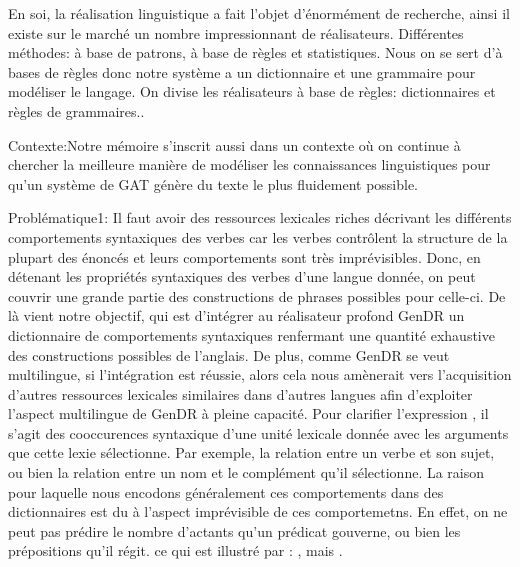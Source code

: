 En soi, la réalisation linguistique a fait l'objet d'énormément de recherche, ainsi il existe sur le marché un nombre impressionnant de réalisateurs. Différentes méthodes: à base de patrons, à base de règles et statistiques. Nous on se sert d'à bases de règles donc notre système a un dictionnaire et une grammaire pour modéliser le langage. On divise les réalisateurs à base de règles: dictionnaires et règles de grammaires.. 

Contexte:Notre mémoire s'inscrit aussi dans un contexte où on continue à chercher la meilleure manière de modéliser les connaissances linguistiques pour qu'un système de \ac{GAT} génère du texte le plus fluidement possible.

Problématique1: Il faut avoir des ressources lexicales riches décrivant les différents comportements syntaxiques des verbes car les verbes contrôlent la structure de la plupart des énoncés et leurs comportements sont très imprévisibles. Donc, en détenant les propriétés syntaxiques des verbes d'une langue donnée, on peut couvrir une grande partie des constructions de phrases possibles pour celle-ci. De là vient notre objectif, qui est d'intégrer au réalisateur profond GenDR un dictionnaire de comportements syntaxiques renfermant une quantité exhaustive des constructions possibles de l'anglais. De plus, comme GenDR se veut multilingue, si l'intégration est réussie, alors cela nous amènerait vers l'acquisition d'autres ressources lexicales similaires dans d'autres langues afin d'exploiter l'aspect multilingue de GenDR à pleine capacité. Pour clarifier l'expression , il s'agit des cooccurences syntaxique d'une unité lexicale donnée avec les arguments que cette lexie sélectionne. Par exemple, la relation entre un verbe et son sujet, ou bien la relation entre un nom et le complément qu'il sélectionne. La raison pour laquelle nous encodons généralement ces comportements dans des dictionnaires est du à l'aspect imprévisible de ces comportemetns. En effet, on ne peut pas prédire le nombre d'actants qu'un prédicat gouverne, ou bien les prépositions qu'il régit. ce qui est illustré par \cite{MilicevicSchemaregimepont2009}: , mais .

